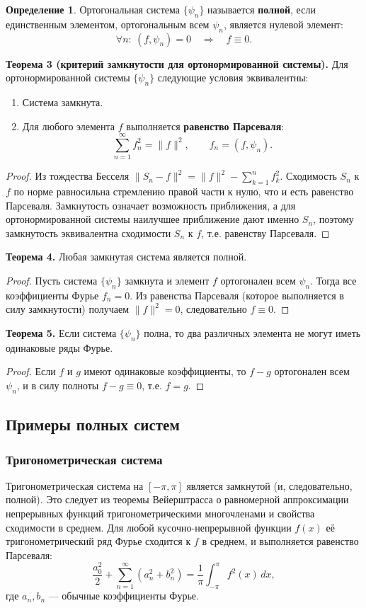 \documentclass{article}
\theoremstyle{definition}
\newtheorem{definition}{Определение}
\begin{document}
\begin{definition}
Ортогональная система $\{\psi_n\}$ называется \textbf{полной}, если единственным элементом, ортогональным всем $\psi_n$, является нулевой элемент:
\[
\forall n:\ (f,\psi_n)=0 \quad\Rightarrow\quad f\equiv0.
\]
\end{definition}

\textbf{Теорема 3 (критерий замкнутости для ортонормированной системы).} 
Для ортонормированной системы $\{\psi_n\}$ следующие условия эквивалентны:
\begin{enumerate}
    \item Система замкнута.
    \item Для любого элемента $f$ выполняется \textbf{равенство Парсеваля}:
    \[
    \sum_{n=1}^{\infty} f_n^2 = \|f\|^2,\qquad f_n=(f,\psi_n).
    \]
\end{enumerate}
\begin{proof}
Из тождества Бесселя $\|S_n-f\|^2 = \|f\|^2 - \sum_{k=1}^n f_k^2$. Сходимость $S_n$ к $f$ по норме равносильна стремлению правой части к нулю, что и есть равенство Парсеваля. Замкнутость означает возможность приближения, а для ортонормированной системы наилучшее приближение дают именно $S_n$, поэтому замкнутость эквивалентна сходимости $S_n$ к $f$, т.е. равенству Парсеваля.
\end{proof}

\textbf{Теорема 4.} Любая замкнутая система является полной.
\begin{proof}
Пусть система $\{\psi_n\}$ замкнута и элемент $f$ ортогонален всем $\psi_n$. Тогда все коэффициенты Фурье $f_n=0$. Из равенства Парсеваля (которое выполняется в силу замкнутости) получаем $\|f\|^2=0$, следовательно $f\equiv0$.
\end{proof}

\textbf{Теорема 5.} Если система $\{\psi_n\}$ полна, то два различных элемента не могут иметь одинаковые ряды Фурье.
\begin{proof}
Если $f$ и $g$ имеют одинаковые коэффициенты, то $f-g$ ортогонален всем $\psi_n$, и в силу полноты $f-g\equiv0$, т.е. $f=g$.
\end{proof}

\subsection{Примеры полных систем}
\subsubsection{Тригонометрическая система}
Тригонометрическая система на $[-\pi,\pi]$ является замкнутой (и, следовательно, полной). Это следует из теоремы Вейерштрасса о равномерной аппроксимации непрерывных функций тригонометрическими многочленами и свойства сходимости в среднем. Для любой кусочно-непрерывной функции $f(x)$ её тригонометрический ряд Фурье сходится к $f$ в среднем, и выполняется равенство Парсеваля:
\[
\frac{a_0^2}{2} + \sum_{n=1}^{\infty} (a_n^2 + b_n^2) = \frac{1}{\pi}\int_{-\pi}^{\pi} f^2(x)\,dx,
\]
где $a_n,b_n$ — обычные коэффициенты Фурье.
\end{document}
